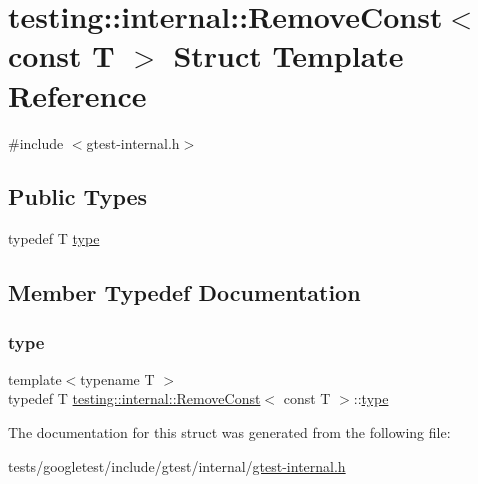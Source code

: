 \hypertarget{structtesting_1_1internal_1_1RemoveConst_3_01const_01T_01_4}{}\section{testing\+:\+:internal\+:\+:Remove\+Const$<$ const T $>$ Struct Template Reference}
\label{structtesting_1_1internal_1_1RemoveConst_3_01const_01T_01_4}


{\ttfamily \#include $<$gtest-\/internal.\+h$>$}

\subsection*{Public Types}
\begin{DoxyCompactItemize}
\item 
typedef T \hyperlink{structtesting_1_1internal_1_1RemoveConst_3_01const_01T_01_4_ac88c6824d228ab05091e5a4f1c1a95fc}{type}
\end{DoxyCompactItemize}


\subsection{Member Typedef Documentation}
\mbox{\label{structtesting_1_1internal_1_1RemoveConst_3_01const_01T_01_4_ac88c6824d228ab05091e5a4f1c1a95fc}} 
\subsubsection{\texorpdfstring{type}{type}}
{\footnotesize\ttfamily template$<$typename T $>$ \\
typedef T \hyperlink{structtesting_1_1internal_1_1RemoveConst}{testing\+::internal\+::\+Remove\+Const}$<$ const T $>$\+::\hyperlink{structtesting_1_1internal_1_1RemoveConst_3_01const_01T_01_4_ac88c6824d228ab05091e5a4f1c1a95fc}{type}}



The documentation for this struct was generated from the following file\+:\begin{DoxyCompactItemize}
\item 
tests/googletest/include/gtest/internal/\hyperlink{gtest-internal_8h}{gtest-\/internal.\+h}\end{DoxyCompactItemize}
